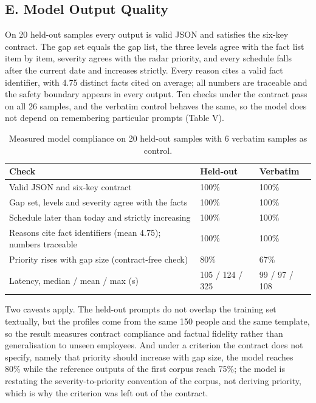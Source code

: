 \documentclass[conference]{IEEEtran}
\begin{document}
\subsection{E. Model Output Quality}

On 20 held-out samples every output is valid JSON and satisfies the six-key contract. The gap set equals the gap list, the three levels agree with the fact list item by item, severity agrees with the radar priority, and every schedule falls after the current date and increases strictly. Every reason cites a valid fact identifier, with 4.75 distinct facts cited on average; all numbers are traceable and the safety boundary appears in every output. Ten checks under the contract pass on all 26 samples, and the verbatim control behaves the same, so the model does not depend on remembering particular prompts (Table V).


\begin{table}[t]
\caption{Measured model compliance on 20 held-out samples with 6 verbatim samples as control.}
\centering
\footnotesize
\begin{tabular}{@{}p{}p{}p{}@{}}
\hline
\textbf{Check} & \textbf{Held-out} & \textbf{Verbatim} \\ \hline
Valid JSON and six-key contract & 100\% & 100\% \\
Gap set, levels and severity agree with the facts & 100\% & 100\% \\
Schedule later than today and strictly increasing & 100\% & 100\% \\
Reasons cite fact identifiers (mean 4.75); numbers traceable & 100\% & 100\% \\
Priority rises with gap size (contract-free check) & 80\% & 67\% \\
Latency, median / mean / max (s) & 105 / 124 / 325 & 99 / 97 / 108 \\
\hline
\end{tabular}
\end{table}

Two caveats apply. The held-out prompts do not overlap the training set textually, but the profiles come from the same 150 people and the same template, so the result measures contract compliance and factual fidelity rather than generalisation to unseen employees. And under a criterion the contract does not specify, namely that priority should increase with gap size, the model reaches 80\% while the reference outputs of the first corpus reach 75\%; the model is restating the severity-to-priority convention of the corpus, not deriving priority, which is why the criterion was left out of the contract.
\end{document}

